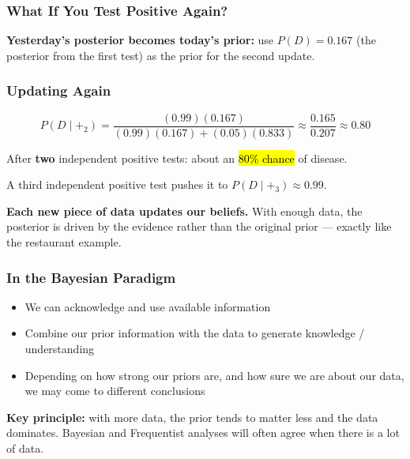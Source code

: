 \documentclass[slidestop,compress,mathserif]{beamer}
\begin{document}
\begin{frame}
    \frametitle{What If You Test Positive Again?}
    \pause

    \medskip
    \textbf{Yesterday's posterior becomes today's prior:} use $P(D) = 0.167$ (the posterior from the first test) as the prior for the second update.
\end{frame}

\begin{frame}
    \frametitle{Updating Again}
    \[
    P(D \mid +_2) = \frac{(0.99)(0.167)}{(0.99)(0.167) + (0.05)(0.833)} \approx \frac{0.165}{0.207} \approx 0.80
    \]
    \pause

    \medskip
    After \textbf{two} independent positive tests: about an \hl{80\% chance} of disease.
    \pause

    \medskip
    A third independent positive test pushes it to $P(D \mid +_3) \approx 0.99$.
    \pause

    \medskip
    \textbf{Each new piece of data updates our beliefs.} With enough data, the posterior is driven by the evidence rather than the original prior --- exactly like the restaurant example.
\end{frame}



\begin{frame}
\frametitle{In the Bayesian Paradigm}

\begin{itemize}
\item We can acknowledge and use available information 
\pause
\item Combine our prior information with the data to generate knowledge / understanding 
\pause
\item Depending on how strong our priors are, and how sure we are about our data, we may come to different conclusions
\end{itemize}

\pause
\medskip

\textbf{Key principle:} with more data, the prior tends to matter less and the data dominates. 
Bayesian and Frequentist analyses will often agree when there is a lot of data.

\end{frame}
\end{document}
